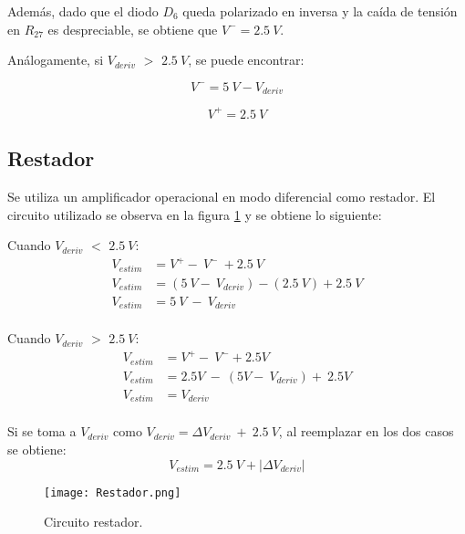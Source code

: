 Además, dado que el diodo $D_6$ queda polarizado en inversa y la caída de tensión en $R_{27}$ es despreciable, se obtiene que $V^- = 2.5\:V$.

Análogamente, si $V_{deriv}$ $\mathrm{>}$ $2.5\:V$, se puede encontrar:

\begin{equation} \label{eq_V+_3}
	V^- =5\:V-V_{deriv} 
\end{equation}

\begin{equation} 
	V^+ = 2.5\:V
\end{equation}


\subsection{Restador}

Se utiliza un amplificador operacional en modo diferencial como restador. El circuito utilizado se observa en la figura \ref{fig:img_Restador} y se obtiene lo siguiente:

Cuando $V_{deriv}$ $\mathrm{<}$ $2.5\:V$:
\begin{equation*} 
	\begin{aligned}
		V_{estim}&=V^+-\ V^-\ +2.5\:V\\ 
		V_{estim}&=(5\:V -\ V_{deriv})-(2.5\: V)+2.5\:V\\
		V_{estim}&=5\: V\ -\ V_{deriv}\\ 
	\end{aligned}
\end{equation*}


Cuando $V_{deriv}$ $\mathrm{>}$ $2.5\:V$: 
\begin{equation*} 
	\begin{aligned}
		V_{estim}&=V^+-\ V^-+2.5V\\ 
		V_{estim}&=2.5V\ -\ (5V-\ V_{deriv})+\ 2.5V\\
		V_{estim}&=V_{deriv}\\
	\end{aligned}
\end{equation*}

Si se toma a $V_{deriv}$ como $V_{deriv}=\mathit{\Delta}V_{deriv}\ +\ 2.5\: V$, al reemplazar en los dos casos se obtiene:
\begin{equation} \label{eq_rest_3}
	V_{estim}= 2.5\:V + |\mathit{\Delta}V_{deriv}|
\end{equation}

\begin{figure}[H]
	\centering
	\texttt{[image: Restador.png]}
	\caption{Circuito restador.}
	\label{fig:img_Restador}
\end{figure}

